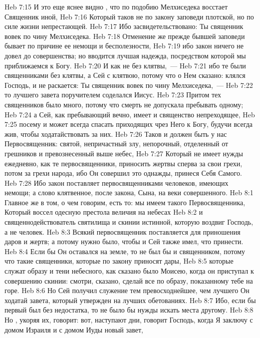 \vs Heb 7:15 И это еще яснее видно , что по подобию Мелхиседека восстает Священник иной,
\vs Heb 7:16 Который таков не по закону заповеди плотской, но по силе жизни непрестающей.
\vs Heb 7:17 Ибо засвидетельствовано: Ты священник вовек по чину Мелхиседека.
\vs Heb 7:18 Отменение же прежде бывшей заповеди бывает по причине ее немощи и бесполезности,
\vs Heb 7:19 ибо закон ничего не довел до совершенства; но вводится лучшая надежда, посредством которой мы приближаемся к Богу.
\vs Heb 7:20 И как  не без клятвы,~---
\vs Heb 7:21 ибо те были священниками без клятвы, а Сей с клятвою, потому что о Нем сказано: клялся Господь, и не раскается: Ты священник вовек по чину Мелхиседека,~---
\vs Heb 7:22 то лучшего завета поручителем соделался Иисус.
\vs Heb 7:23 Притом тех священников было много, потому что смерть не допускала пребывать одному;
\vs Heb 7:24 а Сей, как пребывающий вечно, имеет и священство непреходящее,
\vs Heb 7:25 посему и может всегда спасать приходящих чрез Него к Богу, будучи всегда жив, чтобы ходатайствовать за них.
\rsbpar\vs Heb 7:26 Таков и должен быть у нас Первосвященник: святой, непричастный злу, непорочный, отделенный от грешников и превознесенный выше небес,
\vs Heb 7:27 Который не имеет нужды ежедневно, как те первосвященники, приносить жертвы сперва за свои грехи, потом за грехи народа, ибо Он совершил это однажды, принеся  Себя Самого.
\vs Heb 7:28 Ибо закон поставляет первосвященниками человеков, имеющих немощи; а слово клятвенное, после закона,  Сына, на веки совершенного.
\vs Heb 8:1 Главное же в том, о чем говорим, есть то: мы имеем такого Первосвященника, Который воссел одесную престола величия на небесах
\vs Heb 8:2 и  священнодействователь святилища и скинии истинной, которую воздвиг Господь, а не человек.
\vs Heb 8:3 Всякий первосвященник поставляется для приношения даров и жертв; а потому нужно было, чтобы и Сей также имел, что принести.
\vs Heb 8:4 Если бы Он оставался на земле, то не был бы и священником, потому что  такие священники, которые по закону приносят дары,
\vs Heb 8:5 которые служат образу и тени небесного, как сказано было Моисею, когда он приступал к совершению скинии: смотри, сказано, сделай все по образу, показанному тебе на горе.
\vs Heb 8:6 Но Сей  получил служение тем превосходнейшее, чем лучшего Он ходатай завета, который утвержден на лучших обетованиях.
\vs Heb 8:7 Ибо, если бы первый  был без недостатка, то не было бы нужды искать места другому.
\vs Heb 8:8 Но , укоряя их, говорит: вот, наступают дни, говорит Господь, когда Я заключу с домом Израиля и с домом Иуды новый завет,

